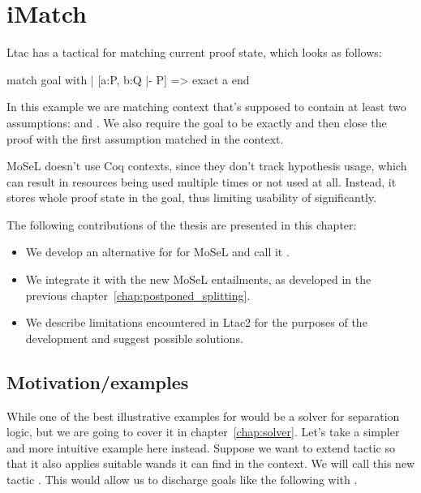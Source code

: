 \chapter{iMatch}
\label{chap:imatch}

Ltac has a tactical for matching current proof state, which looks as follows:

\begin{coq}
match goal with
| [a:P, b:Q |- P] => exact a
end
\end{coq}

In this example we are matching context that's supposed to contain at least two assumptions:  and .
We also require the goal to be exactly  and then close the proof with the first assumption matched in the context.

MoSeL doesn't use Coq contexts, since they don't track hypothesis usage, which can result in resources being used multiple times or not used at all.
Instead, it stores whole proof state in the goal, thus limiting usability of  significantly.

The following contributions of the thesis are presented in this chapter:
\begin{itemize}
\item We develop an alternative for  for MoSeL and call it .
\item We integrate it with the new MoSeL entailments, as developed in the previous chapter~\ref{chap:postponed_splitting}.
\item We describe limitations encountered in Ltac2 for the purposes of the development and suggest possible solutions.
\end{itemize}

\section{Motivation/examples}

While one of the best illustrative examples for  would be a solver for separation logic, but we are going to cover it in chapter~\ref{chap:solver}.
Let's take a simpler and more intuitive example here instead.
Suppose we want to extend  tactic so that it also applies suitable wands it can find in the context.
We will call this new tactic .
This would allow us to discharge goals like the following with .\\

